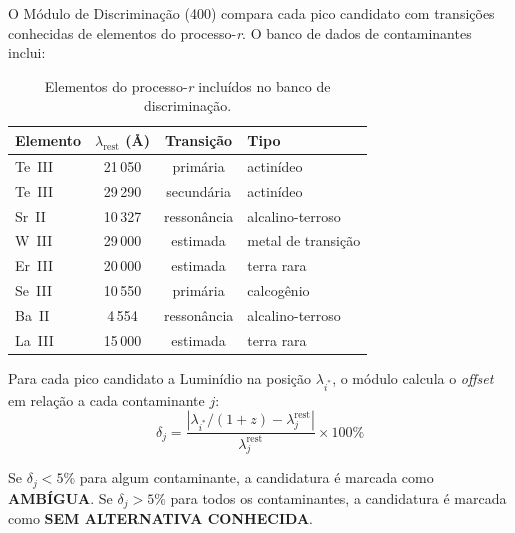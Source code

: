 \documentclass[12pt,a4paper]{article}
\begin{document}
O Módulo de Discriminação (400) compara cada pico candidato com
transições conhecidas de elementos do processo-\textit{r}. O
banco de dados de contaminantes inclui:

\begin{table}[H]
\centering
\caption{Elementos do processo-\textit{r} incluídos no banco de
discriminação.}
\label{tab:contaminantes}
\begin{tabular}{lccl}
\toprule
\textbf{Elemento} & $\lambda_{\text{rest}}$ (\AA) &
  \textbf{Transição} & \textbf{Tipo} \\
\midrule
Te~III & 21\,050 & primária & actinídeo \\
Te~III & 29\,290 & secundária & actinídeo \\
Sr~II & 10\,327 & ressonância & alcalino-terroso \\
W~III & 29\,000 & estimada & metal de transição \\
Er~III & 20\,000 & estimada & terra rara \\
Se~III & 10\,550 & primária & calcogênio \\
Ba~II & 4\,554 & ressonância & alcalino-terroso \\
La~III & 15\,000 & estimada & terra rara \\
\bottomrule
\end{tabular}
\end{table}

Para cada pico candidato a Luminídio na posição
$\lambda_{i^*}$, o módulo calcula o \textit{offset} em relação
a cada contaminante $j$:
\begin{equation}
\delta_j = \frac{|\lambda_{i^*}/(1+z) - \lambda_j^{\text{rest}}|}
  {\lambda_j^{\text{rest}}} \times 100\%
\label{eq:offset_contaminante}
\end{equation}

Se $\delta_j < 5\%$ para algum contaminante, a candidatura é
marcada como \textbf{AMBÍGUA}. Se $\delta_j > 5\%$ para todos
os contaminantes, a candidatura é marcada como
\textbf{SEM ALTERNATIVA CONHECIDA}.
\end{document}
